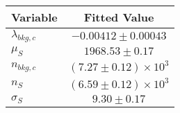 \begin{tabular}[t]{lc}
\hline
Variable &Fitted Value\\
\hline\hline
$\lambda_{bkg,c}$&$-0.00412\pm0.00043$\\
\hline
$\mu_{S}$&$1968.53\pm0.17$\\
\hline
$n_{bkg,c}$&$(7.27\pm0.12)\times 10^3$\\
\hline
$n_{S}$&$(6.59\pm0.12)\times 10^3$\\
\hline
$\sigma_{S}$&$9.30\pm0.17$\\
\hline
\end{tabular}